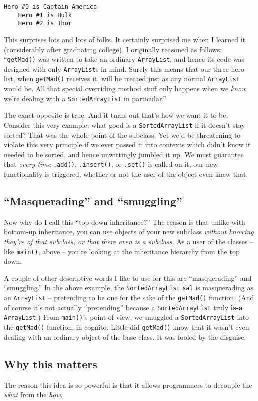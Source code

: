 \begin{Verbatim}[fontsize=\small,samepage=true,frame=single]
    Hero #0 is Captain America
    Hero #1 is Hulk
    Hero #2 is Thor
\end{Verbatim}

This surprises lots and lots of folks. It certainly surprised me when I
learned it (considerably after graduating college). I originally reasoned as
follows: ``\texttt{getMad()} was written to take an ordinary
\texttt{ArrayList}, and hence its code was designed with only
\texttt{ArrayList}s in mind. Surely this means that our three-hero-list, when
\texttt{getMad()} receives it, will be treated just as any normal
\texttt{ArrayList} would be. All that special overriding method stuff only
happens when we \textit{know} we're dealing with a \texttt{SortedArrayList} in
particular.''

The exact opposite is true. And it turns out that's how we want it to be.
Consider this very example: what good is a \texttt{SortedArrayList} if it
doesn't stay sorted? That was the whole point of the subclass! Yet we'd be
threatening to violate this very principle if we ever passed it into contexts
which didn't know it needed to be sorted, and hence unwittingly jumbled it up.
We must guarantee that \textit{every time} \texttt{.add()},
\texttt{.insert()}, or \texttt{.set()} is called on it, our new functionality
is triggered, whether or not the user of the object even knew that.


\subsection{``Masquerading'' and ``smuggling''}

Now why do I call this ``top-down inheritance?'' The reason is that unlike with
bottom-up inheritance, you can use objects of your new subclass
\textit{without knowing they're of that subclass, or that there even is a
subclass.} As a user of the classes -- like \texttt{main()}, above -- you're
looking at the inheritance hierarchy from the top down.

\begin{samepage}
A couple of other descriptive words I like to use for this are ``masquerading''
and ``smuggling.'' In the above example, the \texttt{SortedArrayList}
\texttt{sal} is masquerading as an \texttt{ArrayList} -- pretending to be one
for the sake of the \texttt{getMad()} function. (And of course it's not
actually ``pretending'' because a \texttt{SortedArrayList} truly
\mbox{\textbf{is-a}} \texttt{ArrayList}.) From \texttt{main()}'s point of
view, we smuggled a \texttt{SortedArrayList} into the \texttt{getMad()}
function, in cognito. Little did \texttt{getMad()} know that it wasn't even
dealing with an ordinary object of the base class. It was fooled by the
disguise.

\subsection{Why this matters}

The reason this idea is so powerful is that it allows programmers to decouple
the \textit{what} from the \textit{how}.
\end{samepage}

